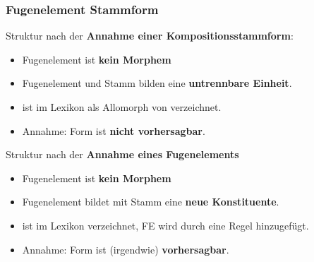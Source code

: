 \begin{frame}
\frametitle{Fugenelement \vs Stammform}

\begin{minipage}{.78\textwidth}
	
Struktur nach der \textbf{Annahme einer Kompositionsstammform}:

\begin{itemize}	
	\item Fugenelement ist \textbf{kein Morphem}

	\item Fugenelement und Stamm bilden eine \textbf{untrennbare Einheit}.
	
	\item {} ist im Lexikon als Allomorph von  verzeichnet.
	
	\item Annahme: Form  ist \textbf{nicht vorhersagbar}.
\end{itemize}

\end{minipage}
\begin{minipage}{.21\textwidth}	
	\centering	
\end{minipage}

\begin{minipage}{.76\textwidth}

\pause 

Struktur nach der \textbf{Annahme eines Fugenelements}

\begin{itemize}	
	\item Fugenelement ist \textbf{kein Morphem}
	
	\item Fugenelement bildet mit Stamm eine \textbf{neue Konstituente}.
	
	\item {} ist im Lexikon verzeichnet, FE  wird durch eine Regel hinzugefügt.
	
	\item Annahme: Form  ist (irgendwie) \textbf{vorhersagbar}.
\end{itemize}
	
\end{minipage}
\begin{minipage}{.23\textwidth}	
	\centering	
	\scalebox{.8}{
	\begin{forest}
		[N
		[N 
		[Kind]
		[FE
		[\alertred{-er}]
		]
		]
		[N
		[Wagen]
		]
		]		
	\end{forest}
	}
\end{minipage}

\end{frame}


